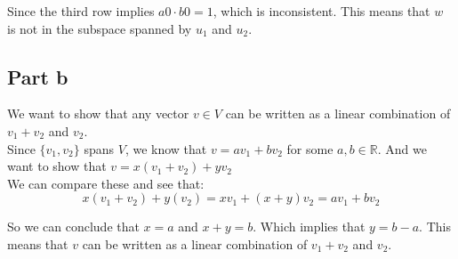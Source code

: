 Since the third row implies $a0\cdot b0 = 1$, which is inconsistent. This means that $w$ is not in the subspace spanned by $u_1$ and $u_2$.

\subsection{Part b}

We want to show that any vector $v\in V$ can be written as a linear combination of $v_1 + v_2$ and $v_2$.\\

Since $\{v_1, v_2\}$ spans $V$, we know that $v = av_1 + bv_2$ for some $a, b\in\mathbb{R}$. And we want to show that $v = x(v_1+v_2) + yv_2$\\

We can compare these and see that:
\[
	x(v_1 + v_2) + y(v_2) = xv_1 + (x+y)v_2 = av_1 + bv_2
\]

So we can conclude that $x = a$ and $x+y = b$. Which implies that $y = b - a$. This means that $v$ can be written as a linear combination of $v_1 + v_2$ and $v_2$.


